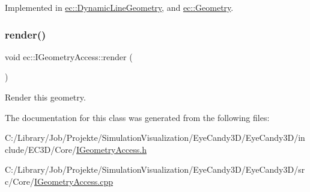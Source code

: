 Implemented in \mbox{\hyperlink{classec_1_1_dynamic_line_geometry_ab56984cee973ef2a73ff67339014f0cf}{ec\+::\+Dynamic\+Line\+Geometry}}, and \mbox{\hyperlink{classec_1_1_geometry_a1f166e70fc880e88092f29ef46afb836}{ec\+::\+Geometry}}.

\mbox{\label{classec_1_1_i_geometry_access_a9b6eaf56646bc2b5aa29385aaba02c7d}} 
\subsubsection{\texorpdfstring{render()}{render()}}
{\footnotesize\ttfamily void ec\+::\+I\+Geometry\+Access\+::render (\begin{DoxyParamCaption}{ }\end{DoxyParamCaption})\hspace{0.3cm}{\ttfamily [virtual]}}



Render this geometry. 



The documentation for this class was generated from the following files\+:\begin{DoxyCompactItemize}
\item 
C\+:/\+Library/\+Job/\+Projekte/\+Simulation\+Visualization/\+Eye\+Candy3\+D/\+Eye\+Candy3\+D/include/\+E\+C3\+D/\+Core/\mbox{\hyperlink{_i_geometry_access_8h}{I\+Geometry\+Access.\+h}}\item 
C\+:/\+Library/\+Job/\+Projekte/\+Simulation\+Visualization/\+Eye\+Candy3\+D/\+Eye\+Candy3\+D/src/\+Core/\mbox{\hyperlink{_i_geometry_access_8cpp}{I\+Geometry\+Access.\+cpp}}\end{DoxyCompactItemize}
